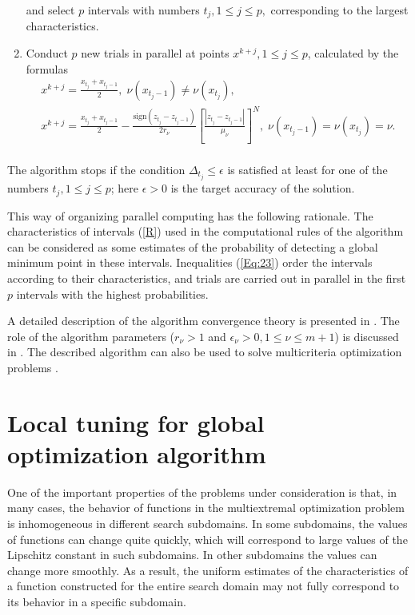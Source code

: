 \documentclass[
11pt,%
tightenlines,%
twoside,%
onecolumn,%
nofloats,%
nobibnotes,%
nofootinbib,%
superscriptaddress,%
noshowpacs,%
centertags]%
{revtex4}
\begin{document}
\begin{enumerate}
and select $p$ intervals with numbers $t_j, 1\leq j \leq p,$ corresponding to the largest characteristics.
\item
Conduct $p$ new trials in parallel at points $x^{k+j}, 1 \leq j \leq p$, calculated by the formulas
\begin{gather*}
x^{k+j}=\frac{x_{t_j}+x_{t_j-1}}{2}, \; \nu(x_{t_j-1})\neq \nu(x_{t_j}), \\
x^{k+j}=\frac{x_{t_j}+x_{t_j-1}}{2}- \frac{\mathrm{sign}(z_{t_j}-z_{t_j-1})}{2r_\nu}\left[\frac{\left|z_{t_j}-z_{t_j-1}\right|}{\mu_\nu}\right]^N, \; \nu(x_{t_j-1})=\nu(x_{t_j})=\nu. \\
\end{gather*} 

\end{enumerate}

The algorithm stops if the condition $\Delta_{t_j}\leq \epsilon$ is satisfied at least for one of the numbers $t_j, 1\leq j \leq p$; here $\epsilon>0$ is the target accuracy of the solution.

This way of organizing parallel computing has the following rationale. The characteristics of intervals (\ref{R}) used in the computational rules of the algorithm can be considered as some estimates of the probability of detecting a global minimum point in these intervals. Inequalities (\ref{Eq:23}) order the intervals according to their characteristics, and trials are carried out in parallel in the first $p$ intervals with the highest probabilities.

A detailed description of the algorithm convergence theory is presented in \cite{Strongin2000,Strongin2013}.
The role of the algorithm parameters ($r_\nu>1$ and $\epsilon_\nu>0, 1\leq\nu\leq m+1$) is discussed in \cite{Strongin2020}.
The described algorithm can also be used to solve multicriteria optimization problems \cite{Gergel2020}.

\section{Local tuning for global optimization algorithm}

One of the important properties of the problems under consideration is that, in many cases, the behavior of functions in the multiextremal optimization problem is inhomogeneous in different search subdomains. In some subdomains, the values of functions can change quite quickly, which will correspond to large values of the Lipschitz constant in such subdomains. In other subdomains the values can change more smoothly. As a result, the uniform estimates of the characteristics of a function constructed for the entire search domain may not fully correspond to its behavior in a specific subdomain. 
\end{document}
